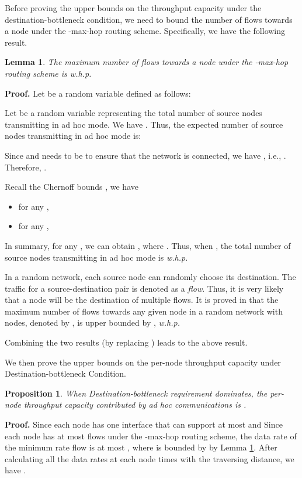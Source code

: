 \documentclass[10pt,journal]{IEEEtran}
\newtheorem{lemma}{Lemma}
\newtheorem{proposition}{Proposition}
\def\done{\hspace*{\fill} }
\begin{document}
Before proving the upper bounds on the throughput capacity under the destination-bottleneck condition, we need to bound the number of flows towards a node under the -max-hop routing scheme. Specifically, we have the following result.

\begin{lemma}
\label{lemma:dh}
The maximum number of flows towards a node under the -max-hop routing scheme is 
 \textit{w.h.p.}
\end{lemma}
\textbf{Proof.} 
Let  be a random variable defined as follows:

Let  be a random variable representing the total number of source nodes transmitting in ad hoc mode. We have . Thus, the expected number of source nodes transmitting in ad hoc mode is:


Since  and  needs to be  to ensure that the network
is connected, we have , i.e., . Therefore, .

Recall the Chernoff bounds \cite{Motwani:1995},  we have
\begin{itemize}
\item for any , 
\item for any , 
\end{itemize}

In summary, for any , we can obtain , where . Thus, when , the total number of source nodes transmitting in ad hoc mode is  \textit{w.h.p.}

In a random network, each source node can randomly choose its destination. The traffic for a source-destination pair is denoted as a \textit{flow}. Thus, it is very likely that a node will be the destination of multiple flows. It is proved in \cite{raab98:balls} that the maximum number of flows towards any given node in a random network with  nodes, denoted by , is upper bounded by , \textit{w.h.p.}

Combining the two results (by replacing ) leads to the above result.
\done

We then prove the upper bounds on the per-node throughput capacity under Destination-bottleneck Condition.
\begin{proposition}
\label{prop:regime-iii}
When Destination-bottleneck requirement dominates, the per-node throughput capacity contributed by ad hoc communications is .
\end{proposition}
\textbf{Proof.}
Since each node has one interface that can support at most  and Since each node has at most  flows under the -max-hop routing scheme, the data rate of the minimum rate flow is at most , where  is bounded by  by Lemma \ref{lemma:dh}. After calculating all the data rates at each node times with the traversing distance, we have .
\end{document}
